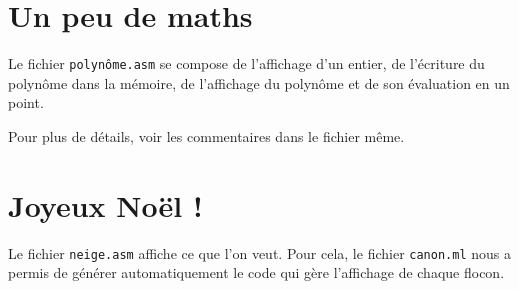 \documentclass{article}
\begin{document}
\section{Un peu de maths} 

Le fichier {\tt polynôme.asm} se compose de l'affichage d'un entier, de l'écriture du polynôme dans la mémoire, de l'affichage du polynôme et de son évaluation en un point.

Pour plus de détails, voir les commentaires dans le fichier même. 

\section{Joyeux Noël !}

Le fichier {\tt neige.asm} affiche ce que l'on veut. Pour cela, le fichier {\tt canon.ml} nous a permis de générer automatiquement le code qui gère l'affichage de chaque flocon.
\end{document}

